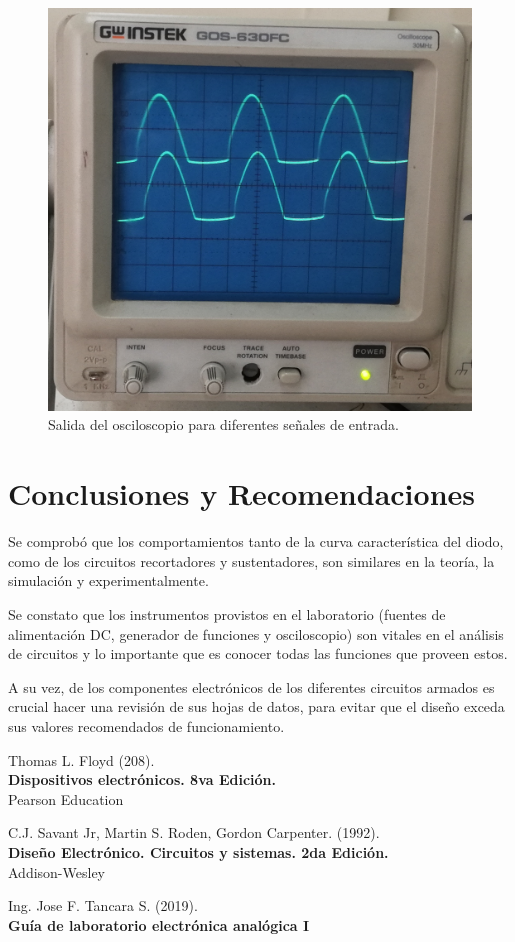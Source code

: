 \documentclass[letter,twoside,11pt]{article}
\begin{document}
\begin{figure}[!h]
\includegraphics[scale=0.102]{fotos/labo1.14.eps}
\caption{Salida del osciloscopio para diferentes señales de entrada.}
\label{labo6}
\end{figure}

\section{Conclusiones y Recomendaciones}
Se comprobó que los comportamientos tanto de la curva característica del diodo,
como de los circuitos recortadores y sustentadores, son similares en la teoría,
la simulación y experimentalmente.

Se constato que los instrumentos provistos en el laboratorio (fuentes de
alimentación DC, generador de funciones y osciloscopio) son vitales en el
análisis de circuitos y lo importante que es conocer todas las funciones que
proveen estos.

A su vez, de los componentes electrónicos de los diferentes circuitos armados
es crucial hacer una revisión de sus hojas de datos, para evitar que el diseño
exceda sus valores recomendados de funcionamiento.

\begin{thebibliography}{99}

Thomas L. Floyd (208).\\
\textbf{Dispositivos electrónicos. 8va Edición.}\\
Pearson Education

C.J. Savant Jr, Martin S. Roden, Gordon Carpenter. (1992).\\
\textbf{Diseño Electrónico. Circuitos y sistemas. 2da Edición.}\\
Addison-Wesley

Ing. Jose F. Tancara S. (2019).\\
\textbf{Guía de laboratorio electrónica analógica I}\\

\end{thebibliography}
\end{document}
